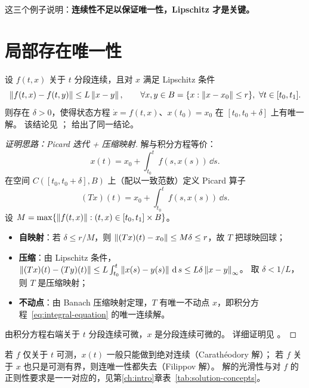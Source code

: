 这三个例子说明：\textbf{连续性不足以保证唯一性，Lipschitz 才是关键。}

\section{局部存在唯一性}\label{sec:local-existence}

\begin{theorem}[局部存在唯一性]\label{thm:local-existence}
  设 $f(t,x)$ 关于 $t$ 分段连续，且对 $x$ 满足 Lipschitz 条件
  \begin{equation}\label{eq:local-lipschitz-thm}
    \left\lVert f(t,x)-f(t,y)\right\rVert\le L\left\lVert x-y\right\rVert,
    \qquad \forall x,y\in B=\{x:\left\lVert x-x_0\right\rVert\le r\},\ \forall t\in[t_0,t_1].
  \end{equation}
  则存在 $\delta>0$，使得状态方程 $\dot x=f(t,x)$、$x(t_0)=x_0$ 在 $[t_0,t_0+\delta]$ 上有唯一解。
  该结论见 \cite[Theorem 3.1]{khalilNonlinearSystems}；\cite[Lemma 1.1]{khalilNonlinearControl2015} 给出了同一结论。
\end{theorem}

\begin{proof}[证明思路：Picard 迭代 + 压缩映射]
  解与积分方程等价：
  \begin{equation}\label{eq:integral-equation}
    x(t)=x_0+\int_{t_0}^{t}f(s,x(s))\,\dd s .
  \end{equation}
  在空间 $C([t_0,t_0+\delta],B)$ 上（配以一致范数）定义 Picard 算子
  \begin{equation}
    (Tx)(t)=x_0+\int_{t_0}^{t}f(s,x(s))\,\dd s .
  \end{equation}
  设 $M=\max\{\left\lVert f(t,x)\right\rVert:(t,x)\in[t_0,t_1]\times B\}$。
  \begin{itemize}
    \item \textbf{自映射}：若 $\delta\le r/M$，则 $\left\lVert(Tx)(t)-x_0\right\rVert\le M\delta\le r$，故 $T$ 把球映回球；
    \item \textbf{压缩}：由 Lipschitz 条件，
          $\left\lVert(Tx)(t)-(Ty)(t)\right\rVert\le L\int_{t_0}^{t}\left\lVert x(s)-y(s)\right\rVert\,\operatorname{d} s\le L\delta\left\lVert x-y\right\rVert_\infty$。
          取 $\delta<1/L$，则 $T$ 是压缩映射；
    \item \textbf{不动点}：由 Banach 压缩映射定理，$T$ 有唯一不动点 $x$，即积分方程~\eqref{eq:integral-equation} 的唯一连续解。
  \end{itemize}
  由积分方程右端关于 $t$ 分段连续可微，$x$ 是分段连续可微的。
  详细证明见 \cite[Appendix C.1]{khalilNonlinearSystems}。
\end{proof}

\begin{remark}[为什么必须有“分段”二字]
  若 $f$ 仅关于 $t$ 可测，$x(t)$ 一般只能做到绝对连续（Carathéodory 解）；
  若 $f$ 关于 $x$ 也只是可测有界，则连唯一性都失去（Filippov 解）。
  解的光滑性与对 $f$ 的正则性要求是一一对应的，见第\ref{ch:intro}章表~\ref{tab:solution-concepts}。
\end{remark}

